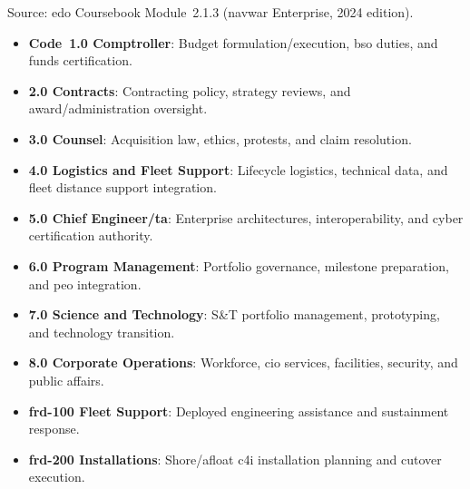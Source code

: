 \documentclass[../main.tex]{subfiles}
\begin{document}
\begin{description}[style=nextline, labelsep=0.5em, font=\bfseries]
  \item[\textbf{\ac{navwar} enterprise directorates.}]
        Source: \ac{edo} Coursebook Module~2.1.3 (\ac{navwar} Enterprise, 2024 edition).
        \begin{itemize}
          \item \textbf{Code~1.0 Comptroller}: Budget formulation/execution, \ac{bso} duties, and funds certification.
          \item \textbf{2.0 Contracts}: Contracting policy, strategy reviews, and award/administration oversight.
          \item \textbf{3.0 Counsel}: Acquisition law, ethics, protests, and claim resolution.
          \item \textbf{4.0 Logistics and Fleet Support}: Lifecycle logistics, technical data, and fleet distance support integration.
          \item \textbf{5.0 Chief Engineer/\ac{ta}}: Enterprise architectures, interoperability, and cyber certification authority.
          \item \textbf{6.0 Program Management}: Portfolio governance, milestone preparation, and \ac{peo} integration.
          \item \textbf{7.0 Science and Technology}: S\&T portfolio management, prototyping, and technology transition.
          \item \textbf{8.0 Corporate Operations}: Workforce, \ac{cio} services, facilities, security, and public affairs.
\item \textbf{\ac{frd}-100 Fleet Support}: Deployed engineering assistance and sustainment response.
\item \textbf{\ac{frd}-200 Installations}: Shore/afloat \ac{c4i} installation planning and cutover execution.
        \end{itemize}


\end{description}
\end{document}
